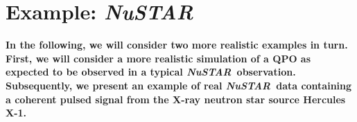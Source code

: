 \documentclass[12pt]{emulateapj}
\newcommand{\project}[1]{\textsl{#1}}
\newcommand{\nustar}{\project{NuSTAR}\xspace}
\begin{document}




\section{Example: \nustar}
\label{sec:nustarqpo}

\textbf{In the following, we will consider two more realistic examples in turn. First, we will consider a more realistic simulation of a QPO as expected to be observed in a typical \nustar\ observation. Subsequently, we present an example of real \nustar\ data containing a coherent pulsed signal from the X-ray neutron star source Hercules X-1.}


\end{document}
